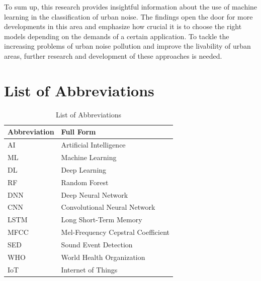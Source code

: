 \documentclass[conference]{IEEEtran}
\begin{document}
To sum up, this research provides insightful information about the use of machine learning in the classification of urban noise. The findings open the door for more developments in this area and emphasize how crucial it is to choose the right models depending on the demands of a certain application. To tackle the increasing problems of urban noise pollution and improve the livability of urban areas, further research and development of these approaches is needed.



\section*{List of Abbreviations}

\begin{table}[h!]
\centering
\begin{tabularx}{0.5\textwidth}{lX}
\toprule
\textbf{Abbreviation} & \textbf{Full Form} \\
\midrule
AI   & Artificial Intelligence \\
ML   & Machine Learning \\
DL   & Deep Learning \\
RF   & Random Forest \\
DNN  & Deep Neural Network \\
CNN  & Convolutional Neural Network \\
LSTM & Long Short-Term Memory \\
MFCC & Mel-Frequency Cepstral Coefficient \\
SED  & Sound Event Detection \\
WHO  & World Health Organization \\
IoT  & Internet of Things \\
\bottomrule
\end{tabularx}
\caption{List of Abbreviations}
\label{tab:abbreviations}
\end{table}









\end{document}
